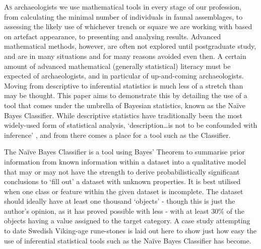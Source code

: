 \lettrine[lines=3,slope=4pt,findent=-3pt]{A}{s} archaeologists we use mathematical tools in every stage of our profession, from calculating the minimal number of individuals in faunal assemblages, to assessing the likely use of whichever trench or square we are working with based on artefact appearance, to presenting and analysing results. Advanced mathematical methods, however, are often not explored until postgraduate study, and are in many situations and for many reasons avoided even then. A certain amount of advanced mathematical (generally statistical) literacy must be expected of archaeologists, and in particular of up-and-coming archaeologists. Moving from descriptive to inferential statistics is much less of a stretch than may be thought. This paper aims to demonstrate this by detailing the use of a tool that comes under the umbrella of Bayesian statistics, known as the Naïve Bayes Classifier. While descriptive statistics have traditionally been the most widely-used form of statistical analysis, ‘description…is not to be confounded with inference’ \parencite[5]{Buck_1996}, and from there comes a place for a tool such as the Classifier. 

	The Naïve Bayes Classifier is a tool using Bayes’ Theorem to summarise prior information from known information within a dataset into a qualitative model that may or may not have the strength to derive probabilistically significant conclusions to ‘fill out’ a dataset with unknown properties. It is best utilised when one class or feature within the given dataset is incomplete. The dataset should ideally have at least one thousand ‘objects’ - though this is just the author’s opinion, as it has proved possible with less - with at least 30\% of the objects having a value assigned to the target category. A case study attempting to date Swedish Viking-age rune-stones is laid out here to show just how easy the use of inferential statistical tools such as the Naïve Bayes Classifier has become. 

	
